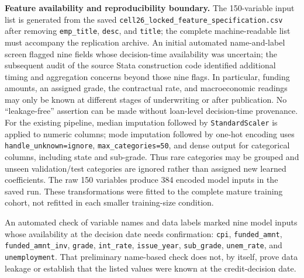 \documentclass[10pt]{article}
\begin{document}
\noindent\textbf{Feature availability and reproducibility boundary.} The 150-variable input list is generated from the saved \texttt{cell26\_locked\_feature\_specification.csv} after removing \texttt{emp\_title}, \texttt{desc}, and \texttt{title}; the complete machine-readable list must accompany the replication archive. An initial automated name-and-label screen flagged nine fields whose decision-time availability was uncertain; the subsequent audit of the source Stata construction code identified additional timing and aggregation concerns beyond those nine flags. In particular, funding amounts, an assigned grade, the contractual rate, and macroeconomic readings may only be known at different stages of underwriting or after publication. No ``leakage-free'' assertion can be made without loan-level decision-time provenance. For the existing pipeline, median imputation followed by \texttt{StandardScaler} is applied to numeric columns; mode imputation followed by one-hot encoding uses \texttt{handle\_unknown=ignore}, \texttt{max\_categories=50}, and dense output for categorical columns, including state and sub-grade. Thus rare categories may be grouped and unseen validation/test categories are ignored rather than assigned new learned coefficients. The raw 150 variables produce 384 encoded model inputs in the saved run. These transformations were fitted to the complete mature training cohort, not refitted in each smaller training-size condition.

An automated check of variable names and data labels marked nine model inputs whose availability at the decision date needs confirmation: \texttt{cpi}, \texttt{funded\_amnt}, \texttt{funded\_amnt\_inv}, \texttt{grade}, \texttt{int\_rate}, \texttt{issue\_year}, \texttt{sub\_grade}, \texttt{unem\_rate}, and \texttt{unemployment}. That preliminary name-based check does not, by itself, prove data leakage or establish that the listed values were known at the credit-decision date.
\end{document}
